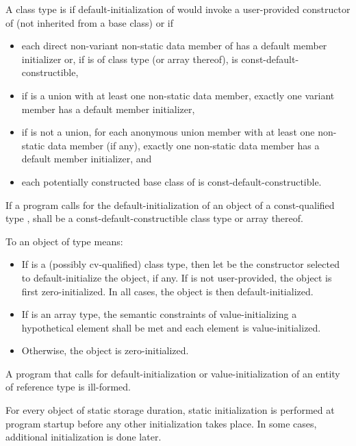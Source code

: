 \pnum
A class type  is  if
default-initialization of  would invoke
a user-provided constructor of  (not inherited from a base class)
or if
\begin{itemize}
\item
each direct non-variant non-static data member  of 
has a default member initializer
or, if  is of class type  (or array thereof),
 is const-default-constructible,
\item
if  is a union with at least one non-static data member,
exactly one variant member has a default member initializer,
\item
if  is not a union,
for each anonymous union member with at least one non-static data member (if any),
exactly one non-static data member has a default member initializer, and
\item
each potentially constructed base class of  is const-default-constructible.
\end{itemize}

If a program calls for the default-initialization of an object of a
const-qualified type ,
 shall be a const-default-constructible class type or array thereof.

\pnum
To
an object of type
means:

\begin{itemize}
\item
If
is a (possibly cv-qualified) class type, then
let  be the constructor selected to
default-initialize the object, if any.
If  is not user-provided, the object is first zero-initialized.
In all cases, the object is then default-initialized.

\item
If
is an array type,
the semantic constraints of value-initializing a hypothetical element
shall be met and
each element is value-initialized.

\item
Otherwise, the object is zero-initialized.
\end{itemize}

\pnum
A program that calls for default-initialization
or value-initialization
of an entity
of reference type is ill-formed.

\pnum
\begin{note}
For every object of static storage duration,
static initialization is performed
at program startup before any other initialization takes place.
In some cases, additional initialization is done later.
\end{note}

